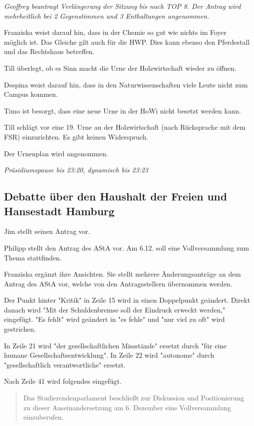 \documentclass[ngerman,headheight=70pt]{scrartcl}
\begin{document}
    \textit{Geoffrey beantragt Verlängerung der Sitzung bis nach TOP 8. Der Antrag
    wird mehrheitlich bei 2 Gegenstimmen und 3 Enthaltungen angenommen.}

    Franziska weist darauf hin, dass in der Chemie so gut wie nichts im Foyer
    möglich ist. Das Gleiche gilt auch für die HWP. Dies kann ebenso den
    Pferdestall und das Rechtshaus betreffen.

    Till überlegt, ob es Sinn macht die Urne der Holzwirtschaft wieder zu öffnen.

    Despina weist darauf hin, dass in den Naturwissenschaften viele Leute nicht
    zum Campus kommen.

    Timo ist besorgt, dass eine neue Urne in der HoWi nicht besetzt werden kann.

    Till schlägt vor eine 19. Urne an der Holzwirtschaft (nach Rücksprache mit
    dem FSR) einzurichten. Es gibt keinen Widerspruch.

    Der Urnenplan wird angenommen.

    \textit{Präsidiumspause bis 23:20, dynamisch bis 23:23}

    \subsection{Debatte über den Haushalt der Freien und Hansestadt Hamburg}

    Jim stellt seinen Antrag vor.

    Philipp stellt den Antrag des AStA vor.
    Am 6.12. soll eine Vollversammlung zum Thema stattfinden.

    Franziska ergänzt ihre Ansichten. Sie stellt mehrere Änderungsanträge an dem
    Antrag des AStA vor, welche von den Antragsstellern übernommen werden.

    Der Punkt hinter "Kritik" in Zeile 15 wird in einen Doppelpunkt geändert.
    Direkt danach wird "Mit der Schuldenbremse soll der Eindruck erweckt werden,"
    eingefügt. "Es fehlt" wird geändert in "es fehle" und "nur viel zu oft"
    wird gestrichen.

    In Zeile 21 wird "der gesellschaftlichen Missstände" ersetzt durch "für eine
    humane Gesellschaftsentwicklung". In Zeile 22 wird "autonome" durch
    "gesellschaftlich verantwortliche" ersetzt.

    Nach Zeile 41 wird folgendes eingefügt.

    \blockquote{
        Das Studierendenparlament beschließt zur Diskussion und Positionierung
        zu dieser Auseinandersetzung am 6. Dezember eine Vollversammlung
        einzuberufen.
    }
\end{document}
